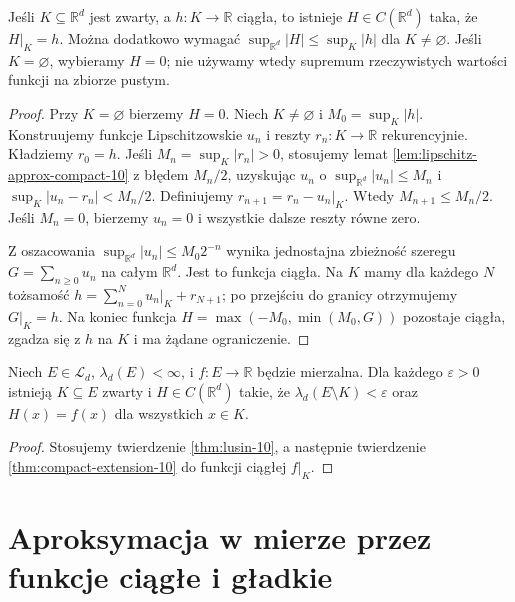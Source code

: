 \begin{twierdzenie}
\label{thm:compact-extension-10}
Jeśli $K\subseteq\mathbb R^d$ jest zwarty,
a $h:K\to\mathbb R$ ciągła, to istnieje
$H\in C(\mathbb R^d)$ taka, że $H|_K=h$.
Można dodatkowo wymagać
$\sup_{\mathbb R^d}|H|\le\sup_K|h|$
dla $K\ne\varnothing$. Jeśli $K=\varnothing$,
wybieramy $H=0$; nie używamy wtedy supremum
rzeczywistych wartości funkcji na zbiorze pustym.
\end{twierdzenie}
\begin{proof}
Przy $K=\varnothing$ bierzemy $H=0$.
Niech $K\ne\varnothing$ i $M_0=\sup_K|h|$.
Konstruujemy funkcje Lipschitzowskie $u_n$ i
reszty $r_n:K\to\mathbb R$ rekurencyjnie.
Kładziemy $r_0=h$. Jeśli
$M_n=\sup_K|r_n|>0$, stosujemy lemat
\ref{lem:lipschitz-approx-compact-10} z błędem
$M_n/2$, uzyskując $u_n$ o
$\sup_{\mathbb R^d}|u_n|\le M_n$ i
$\sup_K|u_n-r_n|<M_n/2$.
Definiujemy $r_{n+1}=r_n-u_n|_K$.
Wtedy $M_{n+1}\le M_n/2$. Jeśli $M_n=0$,
bierzemy $u_n=0$ i wszystkie dalsze reszty
równe zero.

Z oszacowania
$\sup_{\mathbb R^d}|u_n|\le M_0 2^{-n}$
wynika jednostajna zbieżność szeregu
$G=\sum_{n\ge0}u_n$ na całym $\mathbb R^d$.
Jest to funkcja ciągła. Na $K$ mamy dla każdego
$N$ tożsamość
$h=\sum_{n=0}^Nu_n|_K+r_{N+1}$;
po przejściu do granicy otrzymujemy $G|_K=h$.
Na koniec funkcja $H=\max(-M_0,\min(M_0,G))$
pozostaje ciągła, zgadza się z $h$ na $K$
i ma żądane ograniczenie.
\end{proof}

\begin{wniosek}
\label{cor:lusin-extension-10}
Niech $E\in\mathcal L_d$, $\lambda_d(E)<\infty$,
i $f:E\to\mathbb R$ będzie mierzalna. Dla każdego
$\varepsilon>0$ istnieją $K\subseteq E$ zwarty
i $H\in C(\mathbb R^d)$ takie, że
$\lambda_d(E\setminus K)<\varepsilon$ oraz
$H(x)=f(x)$ dla wszystkich $x\in K$.
\end{wniosek}
\begin{proof}
Stosujemy twierdzenie \ref{thm:lusin-10},
a następnie twierdzenie \ref{thm:compact-extension-10}
do funkcji ciągłej $f|_K$.
\end{proof}

\section{Aproksymacja w mierze przez funkcje ciągłe i gładkie}

